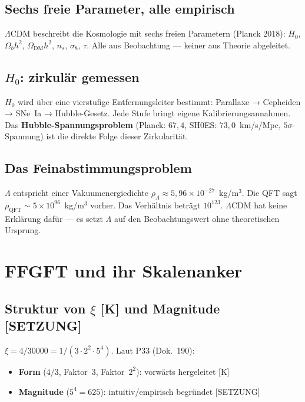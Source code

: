\section{Sechs freie Parameter, alle empirisch}

$\Lambda$CDM beschreibt die Kosmologie mit sechs freien Parametern
(Planck 2018): $H_0$, $\Omega_b h^2$, $\Omega_\text{DM} h^2$, $n_s$,
$\sigma_8$, $\tau$. Alle aus Beobachtung — keiner aus Theorie abgeleitet.

\section{$H_0$: zirkulär gemessen}

$H_0$ wird über eine vierstufige Entfernungsleiter bestimmt:
Parallaxe → Cepheiden → SNe~Ia → Hubble-Gesetz. Jede Stufe bringt
eigene Kalibrierungsannahmen. Das \textbf{Hubble-Spannungsproblem}
(Planck: $67{,}4$, SH0ES: $73{,}0$~km/s/Mpc, $5\sigma$-Spannung) ist
die direkte Folge dieser Zirkularität.

\section{Das Feinabstimmungsproblem}

$\Lambda$ entspricht einer Vakuumenergiedichte
$\rho_\Lambda \approx 5{,}96\times10^{-27}$~kg/m$^3$.
Die QFT sagt $\rho_\text{QFT} \sim 5\times10^{96}$~kg/m$^3$ vorher.
Das Verhältnis beträgt $10^{123}$. $\Lambda$CDM hat keine Erklärung
dafür — es setzt $\Lambda$ auf den Beobachtungswert ohne
theoretischen Ursprung.

\chapter{FFGFT und ihr Skalenanker}

\section{Struktur von $\xi$ [K] und Magnitude [SETZUNG]}

$\xi = 4/30000 = 1/(3\cdot2^2\cdot5^4)$.
Laut P33 (Dok.~190):

\begin{itemize}
  \item \textbf{Form} ($4/3$, Faktor~3, Faktor~$2^2$): vorwärts hergeleitet [K]
  \item \textbf{Magnitude} ($5^4 = 625$): intuitiv/empirisch begründet [SETZUNG]
\end{itemize}

